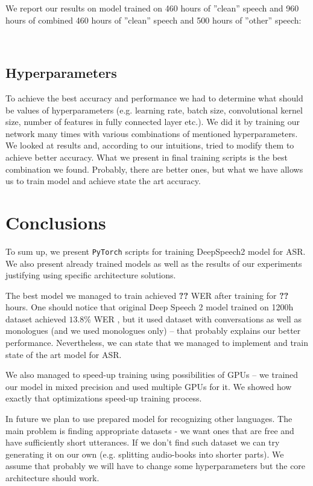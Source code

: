 \documentclass[licencjacka,en]{pracamgr}
\newcommand{\todoplot}[1]{
\ \\
\noindent%
\begin{minipage}{\linewidth}%
\makebox[\linewidth]{%
		\begin{tikzpicture}
		\begin{axis}[
            ymin = 0, ymax = 5,
            xmin = 0, xmax = 600,
            minor y tick num = 4,
            minor x tick num = 1,
            ymajorgrids = true,
            grid style = dashed,
            scaled x ticks = false,
            xlabel = TODO,
            ylabel = TODO,
            legend pos=outer north east,
            no markers
          ]
		  \addplot table[x=epochs,y=training]{\first};
		  \addlegendentry{TODO}

		\end{axis}
		\end{tikzpicture}
		}\captionof{figure}{#1}\label{diag:time}     
\end{minipage}
}
\begin{document}
We report our results on model trained on 460 hours of ''clean'' speech and 960 hours of combined 460 hours of ''clean'' speech and 500 hours of ''other'' speech:

\todoplot{TODO}

\section{Hyperparameters}
To achieve the best accuracy and performance we had to determine what should be values of hyperparameters (e.g. learning rate, batch size, convolutional kernel size, number of features in fully connected layer etc.). We did it by training our network many times with various combinations of mentioned hyperparameters. We looked at results and, according to our intuitions, tried to modify them to achieve better accuracy. What we present in final training scripts is the best combination we found. Probably, there are better ones, but what we have allows us to train model and achieve state the art accuracy.


\chapter{Conclusions}\label{r:concls}

To sum up, we present \texttt{PyTorch} scripts for training DeepSpeech2 model for ASR. We also present already trained models as well as the results of our experiments justifying using specific architecture solutions.

The best model we managed to train achieved \textbf{??} WER after training for \textbf{??} hours. One should notice that original Deep Speech 2 model trained on 1200h dataset achieved $13.8$\% WER \cite{DS2}, but it used dataset with conversations as well as monologues (and we used monologues only) -- that probably explains our better performance. Nevertheless, we can state that we managed to implement and train state of the art model for ASR.

We also managed to speed-up training using possibilities of GPUs -- we trained our model in mixed precision and used multiple GPUs for it. We showed how exactly that optimizations speed-up training process.

In future we plan to use prepared model for recognizing other languages. The main problem is finding appropriate datasets - we want ones that are free and have sufficiently short utterances. If we don't find such dataset we can try generating it on our own (e.g. splitting audio-books into shorter parts). We assume that probably we will have to change some hyperparameters but the core architecture should work.
\end{document}
